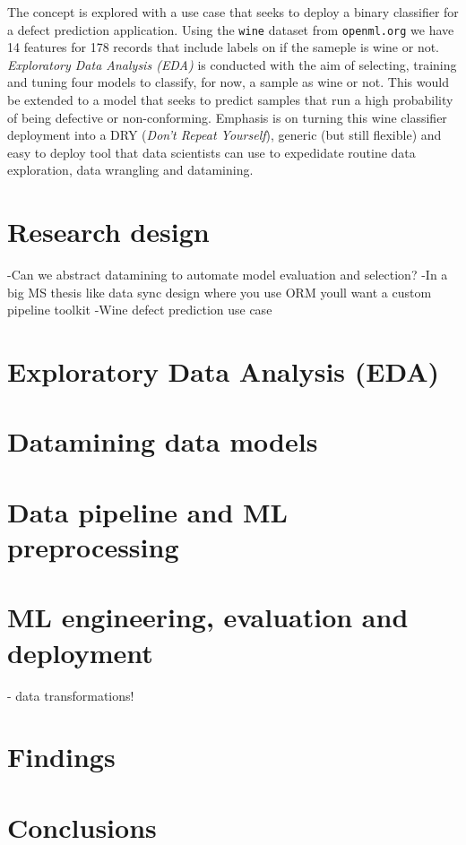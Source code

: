 \documentclass[12pt,letterpaper]{article}
\begin{document}
The concept is explored with a use case that seeks to deploy a binary classifier for a defect prediction application. Using the \texttt{wine} dataset \citep{Vanschoren:2014} from \texttt{openml.org} we have 14 features for 178 records that include labels on if the sameple is wine or not. \emph{Exploratory Data Analysis (EDA)} is conducted with the aim of selecting, training and tuning four models to classify, for now, a sample as wine or not. This would be extended to a model that seeks to predict samples that run a high probability of being defective or non-conforming. Emphasis is on turning this wine classifier deployment into a DRY (\emph{Don't Repeat Yourself}), generic (but still flexible) and easy to deploy tool that data scientists can use to expedidate routine data exploration, data wrangling and datamining. 


\section{Research design}
\tab 
-Can we abstract datamining to automate model evaluation and selection?
-In a big MS thesis like data sync design where you use ORM youll want a custom pipeline toolkit 
-Wine defect prediction use case   

\section{Exploratory Data Analysis (EDA)}
\tab 

\section{Datamining data models}

\section{Data pipeline and ML preprocessing}
\tab 

\section{ML engineering, evaluation and deployment}
\tab 
- data transformations!

\section{Findings}
\tab 

\section{Conclusions}
\tab 
\end{document}
